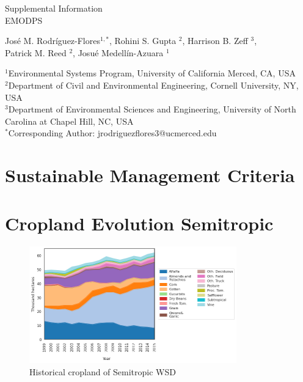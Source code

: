 \documentclass[11pt,a4paper]{article}
\date{}
\begin{document}
\begin{center}
\Large
Supplemental Information \\ EMODPS
\end{center}

\begin{center}
José M. Rodríguez-Flores$^{1,*}$, Rohini S. Gupta $^2$, Harrison B. Zeff $^3$,\\ Patrick M. Reed $^2$, Josué Medellín-Azuara $^1$\\
\end{center}

\begin{center}
\small
$^1$Environmental Systems Program, University of California Merced, CA, USA\\
$^2$Department of Civil and Environmental Engineering, Cornell University, NY, USA\\
$^3$Department of Environmental Sciences and Engineering, University of North Carolina at Chapel Hill, NC, USA\\
$^*$Corresponding Author: jrodriguezflores3@ucmerced.edu
\end{center}

\vspace{0.2cm}

\section{Sustainable Management Criteria}

\section{Cropland Evolution Semitropic}

\begin{figure}[H]
    \centering
    \includegraphics[width=0.8\textwidth]{land_hist_semitropic.png}
    \caption{Historical cropland of Semitropic WSD}
    \label{fig:m1esh1}
\end{figure}
\end{document}
